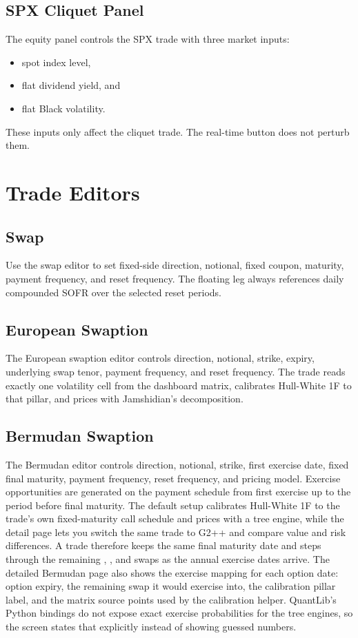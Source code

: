 \documentclass[11pt]{article}
\begin{document}
\subsection{SPX Cliquet Panel}
The equity panel controls the SPX trade with three market inputs:
\begin{itemize}[leftmargin=1.5em]
    \item spot index level,
    \item flat dividend yield, and
    \item flat Black volatility.
\end{itemize}
These inputs only affect the cliquet trade. The real-time button does not perturb them.

\section{Trade Editors}
\subsection{Swap}
Use the swap editor to set fixed-side direction, notional, fixed coupon, maturity, payment frequency, and reset frequency. The floating leg always references daily compounded SOFR over the selected reset periods.

\subsection{European Swaption}
The European swaption editor controls direction, notional, strike, expiry, underlying swap tenor, payment frequency, and reset frequency. The trade reads exactly one volatility cell from the dashboard matrix, calibrates Hull-White 1F to that pillar, and prices with Jamshidian's decomposition.

\subsection{Bermudan Swaption}
The Bermudan editor controls direction, notional, strike, first exercise date, fixed final maturity, payment frequency, reset frequency, and pricing model. Exercise opportunities are generated on the payment schedule from first exercise up to the period before final maturity. The default setup calibrates Hull-White 1F to the trade's own fixed-maturity call schedule and prices with a tree engine, while the detail page lets you switch the same trade to G2++ and compare value and risk differences. A  trade therefore keeps the same final maturity date and steps through the remaining , , and  swaps as the annual exercise dates arrive.
The detailed Bermudan page also shows the exercise mapping for each option date: option expiry, the remaining swap it would exercise into, the calibration pillar label, and the matrix source points used by the calibration helper. QuantLib's Python bindings do not expose exact exercise probabilities for the tree engines, so the screen states that explicitly instead of showing guessed numbers.
\end{document}
